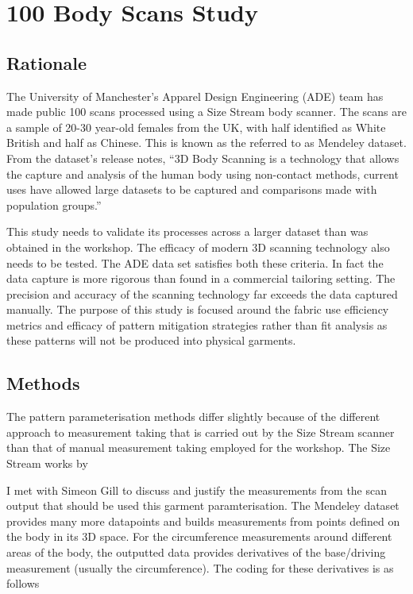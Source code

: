 
\section{100 Body Scans Study}

\subsection{Rationale}
The University of Manchester’s Apparel Design Engineering (ADE) team has made public 100 scans processed using a Size Stream body scanner. The scans are a sample of 20-30 year-old females from the UK, with half identified as White British and half as Chinese. This is known as the referred to as Mendeley dataset. From the dataset’s release notes, “3D Body Scanning is a technology that allows the capture and analysis of the human body using non-contact methods, current uses have allowed large datasets to be captured and comparisons made with population groups.”

This study needs to validate its processes across a larger dataset than was obtained in the workshop. The efficacy of modern 3D scanning technology also needs to be tested. The ADE data set satisfies both these criteria. In fact the data capture is more rigorous than found in a commercial tailoring setting. The precision and accuracy of the scanning technology far exceeds the data captured manually. The purpose of this study is focused around the fabric use efficiency metrics and efficacy of pattern mitigation strategies rather than fit analysis as these patterns will not be produced into physical garments.

\subsection{Methods}
The pattern parameterisation methods differ slightly because of the different approach to measurement taking that is carried out by the Size Stream scanner than that of manual measurement taking employed for the workshop. The Size Stream works by

I met with Simeon Gill to discuss and justify the measurements from the scan output that should be used this garment paramterisation. The Mendeley dataset provides many more datapoints and builds measurements from points defined on the body in its 3D space. For the circumference measurements around different areas of the body, the outputted data provides derivatives of the base/driving measurement (usually the circumference). The coding for these derivatives is as follows

